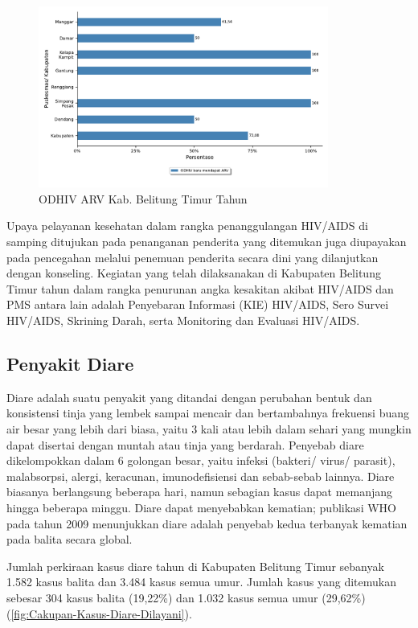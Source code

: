 \begin{figure}[H]
  \centering
  \includegraphics[width=0.85\textwidth]{bab_06/bab_06_03b_ARV}
  \caption{ODHIV ARV Kab. Belitung Timur Tahun \tP}
  \label{fig:HIV-ARV}
\end{figure}

Upaya pelayanan kesehatan dalam rangka penanggulangan HIV/AIDS di samping ditujukan pada penanganan penderita yang ditemukan juga diupayakan pada pencegahan melalui penemuan penderita secara dini yang dilanjutkan dengan konseling.
Kegiatan yang telah dilaksanakan di Kabupaten Belitung Timur tahun \tP dalam rangka penurunan angka kesakitan akibat HIV/AIDS dan PMS antara lain adalah Penyebaran Informasi (KIE) HIV/AIDS, Sero Survei HIV/AIDS, Skrining Darah, serta Monitoring dan Evaluasi HIV/AIDS.

\subsection{Penyakit Diare}
Diare adalah suatu penyakit yang ditandai dengan perubahan bentuk dan konsistensi tinja yang lembek sampai mencair dan bertambahnya frekuensi buang air besar yang lebih dari biasa, yaitu 3 kali atau lebih dalam sehari yang mungkin dapat disertai dengan muntah atau tinja yang berdarah.
Penyebab diare dikelompokkan dalam 6 golongan besar, yaitu infeksi (bakteri/ virus/ parasit), malabsorpsi, alergi, keracunan, imunodefisiensi dan sebab-sebab lainnya. Diare biasanya berlangsung beberapa hari, namun sebagian kasus dapat memanjang hingga beberapa minggu.
Diare dapat menyebabkan kematian; publikasi WHO pada tahun 2009 menunjukkan diare adalah penyebab kedua terbanyak kematian pada balita secara global.

Jumlah perkiraan kasus diare tahun \tP di Kabupaten Belitung Timur sebanyak 1.582 kasus balita dan 3.484 kasus semua umur.
Jumlah kasus yang ditemukan sebesar 304 kasus balita (19,22\%) dan 1.032 kasus semua umur (29,62\%) (\autoref{fig:Cakupan-Kasus-Diare-Dilayani}).

